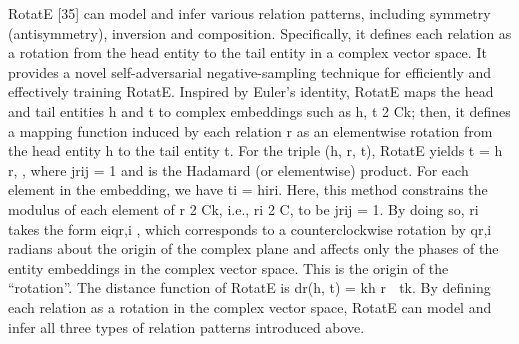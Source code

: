 RotatE [35] can model and infer various relation patterns, including symmetry (antisymmetry),
inversion and composition. Specifically, it defines each relation as a rotation
from the head entity to the tail entity in a complex vector space. It provides a novel
self-adversarial negative-sampling technique for efficiently and effectively training RotatE.
Inspired by Euler's identity, RotatE maps the head and tail entities h and t to complex
embeddings such as h, t 2 Ck; then, it defines a mapping function induced by each relation
r as an elementwise rotation from the head entity h to the tail entity t. For the triple (h, r, t),
RotatE yields t = h  r, , where jrij = 1 and  is the Hadamard (or elementwise) product.
For each element in the embedding, we have ti = hiri. Here, this method constrains the
modulus of each element of r 2 Ck, i.e., ri 2 C, to be jrij = 1. By doing so, ri takes
the form eiqr,i , which corresponds to a counterclockwise rotation by qr,i radians about the
origin of the complex plane and affects only the phases of the entity embeddings in the
complex vector space. This is the origin of the “rotation”. The distance function of RotatE
is dr(h, t) = kh  r 􀀀 tk. By defining each relation as a rotation in the complex vector
space, RotatE can model and infer all three types of relation patterns introduced above.






